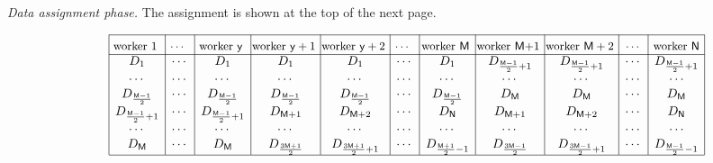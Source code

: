 \documentclass[conference,letterpaper]{IEEEtran}
\begin{document}
{\it Data assignment phase.}
The assignment is shown at the top of the next page.
\begin{figure}
\begin{align*}
\begin{array}{rl|c|c|c|c|c|c|c|c|c|c|c|}\cline{3-3}\cline{4-4}\cline{5-5}\cline{6-6}\cline{7-7}\cline{8-8}\cline{9-9}\cline{10-10}\cline{11-11}\cline{12-12}\cline{13-13}
&&\rule{0pt}{1.2em}\mbox{\small \negmedspace\negmedspace worker 1 \negmedspace\negmedspace} & \mbox{\small \negmedspace\negmedspace $\cdots$ \negmedspace\negmedspace} &  \rule{0pt}{1.2em}\mbox{\small \negmedspace\negmedspace worker $\ysf$ \negmedspace\negmedspace}& \rule{0pt}{1.2em}\mbox{\small \negmedspace\negmedspace worker $\ysf +1$ \negmedspace\negmedspace}&  \rule{0pt}{1.2em}\mbox{\small \negmedspace\negmedspace worker $\ysf+2$ \negmedspace\negmedspace}&  \rule{0pt}{1.2em}\mbox{\small \negmedspace\negmedspace $\cdots$ \negmedspace\negmedspace} &  \rule{0pt}{1.2em}\mbox{\small \negmedspace\negmedspace worker $\Msf$ \negmedspace\negmedspace} &\rule{0pt}{1.2em}\mbox{\small \negmedspace\negmedspace worker $\Msf$+1 \negmedspace\negmedspace} & \rule{0pt}{1.2em}\mbox{\small \negmedspace\negmedspace worker $\Msf+2$ \negmedspace\negmedspace} & \rule{0pt}{1.2em}\mbox{\small \negmedspace\negmedspace $\cdots$\negmedspace\negmedspace }& \rule{0pt}{1.2em}\mbox{\small \negmedspace\negmedspace worker $\Nsf$\negmedspace\negmedspace} \\ 
\cline{3-3}\cline{4-4}\cline{5-5}\cline{6-6}\cline{7-7}\cline{8-8}\cline{9-9}\cline{10-10}\cline{11-11}\cline{12-12}\cline{13-13}
&& D_1& \cdots       &   D_1 &  D_{1} &  D_{1} & \cdots &  D_{1}   &  D_{\frac{\Msf-1}{2}+1}   &  D_{\frac{\Msf-1}{2}+1} &  \cdots  &  D_{\frac{\Msf-1}{2}+1}  \\
&& \cdots & \cdots & \cdots &  \cdots & \cdots  & \cdots   & \cdots  & \cdots & \cdots & \cdots & \cdots  \\ 
&& D_{\frac{\Msf-1}{2}} &    \cdots    & D_{\frac{\Msf-1}{2}}  & D_{\frac{\Msf-1}{2}} & D_{\frac{\Msf-1}{2}}    & \cdots  & D_{\frac{\Msf-1}{2}} &   D_{\Msf}  &   D_{\Msf}  &  \cdots  &  D_{\Msf}  \\
&& D_{\frac{\Msf-1}{2}+1}&  \cdots  & D_{\frac{\Msf-1}{2}+1}  & D_{\Msf+1} & D_{\Msf+2} & \cdots & D_{\Nsf}& D_{\Msf+1}  &  D_{\Msf+2} &   \cdots  &  D_{\Nsf} \\ 
&& \cdots &  \cdots       & \cdots & \cdots & \cdots   & \cdots & \cdots & \cdots & \cdots   & \cdots & \cdots \\
&& D_{\Msf} &   \cdots  &  D_{\Msf} & D_{\frac{3\Msf+1}{2}} & D_{\frac{3\Msf+1}{2} +1}  & \cdots & D_{\frac{\Msf+1}{2}-1} &  D_{\frac{3\Msf-1}{2}}  &  D_{\frac{3\Msf-1}{2}+1}   &  \cdots  &  D_{\frac{\Msf-1}{2}-1}\\  
\cline{3-3}\cline{4-4}\cline{5-5}\cline{6-6}\cline{7-7}\cline{8-8}\cline{9-9}\cline{10-10}\cline{11-11}\cline{12-12}\cline{13-13}
\end{array} 
\end{align*}
\end{figure}
\end{document}
